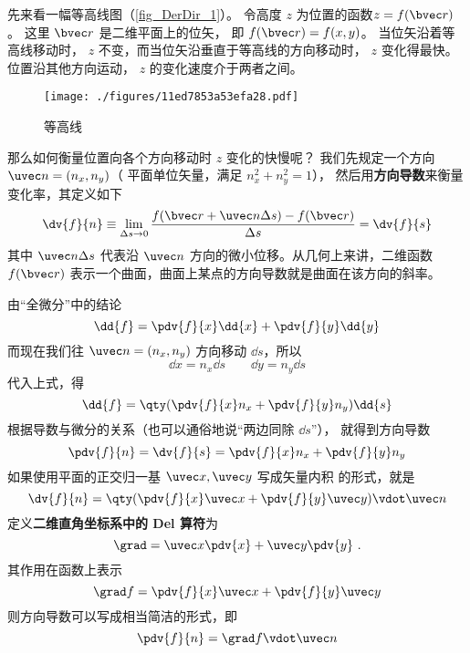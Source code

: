 
先来看一幅等高线图（\autoref{fig_DerDir_1}）。 令高度 $z$ 为位置的函数$z = f(\bvec r)$。 这里 $\bvec r$ 是二维平面上的位矢， 即 $f(\bvec r) = f(x,y)$。 当位矢沿着等高线移动时， $z$ 不变，而当位矢沿垂直于等高线的方向移动时， $z$ 变化得最快。位置沿其他方向运动， $z$ 的变化速度介于两者之间。

\begin{figure}[ht]
\centering
\texttt{[image: ./figures/11ed7853a53efa28.pdf]}
\caption{等高线}\label{fig_DerDir_1}
\end{figure}

那么如何衡量位置向各个方向移动时 $z$ 变化的快慢呢？ 我们先规定一个方向 $\uvec n = (n_x,n_y)$（ 平面单位矢量，满足 $n_x^2 + n_y^2 = 1$）， 然后用\textbf{方向导数}来衡量变化率，其定义如下
 \begin{equation}
\dv{f}{n} \equiv \lim_{\Delta s \to 0} \frac{f(\bvec r + \uvec n\Delta s) - f(\bvec r)}{\Delta s} = \dv{f}{s}
\end{equation}
其中 $\uvec n\Delta s$ 代表沿 $\uvec n$ 方向的微小位移。从几何上来讲，二维函数 $f(\bvec r)$ 表示一个曲面，曲面上某点的方向导数就是曲面在该方向的斜率。


由“全微分”中的结论
\begin{equation}
\dd{f} = \pdv{f}{x} \dd{x} + \pdv{f}{y} \dd{y}
\end{equation}
而现在我们往 $\uvec n = (n_x, n_y)$ 方向移动 $\dd{s}$，所以
\begin{equation}
\dd{x} = n_x \dd{s} \qquad \dd{y} = n_y \dd{s}
\end{equation}
代入上式，得
\begin{equation}
\dd{f} =  \qty(\pdv{f}{x} n_x + \pdv{f}{y} n_y ) \dd{s}
\end{equation}
根据导数与微分的关系（也可以通俗地说“两边同除 $\dd{s}$”）， 就得到方向导数
\begin{equation}
\pdv{f}{n} = \dv{f}{s} = \pdv{f}{x} n_x + \pdv{f}{y} n_y
\end{equation}
如果使用平面的正交归一基 $\uvec x, \uvec y$ 写成矢量内积 的形式，就是
\begin{equation}
\dv{f}{n} = \qty( \pdv{f}{x}\uvec x + \pdv{f}{y}\uvec y ) \vdot \uvec n
\end{equation} 
定义\textbf{二维直角坐标系中的 Del 算符}为
\begin{equation}
\grad  = \uvec x\pdv{x} + \uvec y\pdv{y}~.
\end{equation}
其作用在函数上表示
\begin{equation}
\grad f = \pdv{f}{x}\uvec x + \pdv{f}{y}\uvec y
\end{equation} 
则方向导数可以写成相当简洁的形式，即
\begin{equation}\label{eq_DerDir_7}
\pdv{f}{n} = \grad f \vdot \uvec n
\end{equation} 


